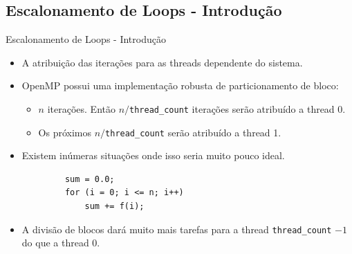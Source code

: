 	\subsection{Escalonamento de Loops - Introdução}
	\begin{frame}[fragile]{Escalonamento de Loops - Introdução}
		\begin{itemize}
			\item A atribuição das iterações para as threads dependente do sistema.
			\item OpenMP possui uma implementação robusta de particionamento de bloco:
			\begin{itemize}
				\item $n$ iterações. Então $n/${\tt thread\_count} iterações serão atribuído a thread 0.
				\item Os próximos $n/${\tt thread\_count} serão atribuído a thread 1.
			\end{itemize}
			\item Existem inúmeras situações onde isso seria muito pouco ideal.
		\end{itemize}
		\begin{verbatim}
			sum = 0.0;
			for (i = 0; i <= n; i++) 
				sum += f(i);
		\end{verbatim}
		\begin{itemize}
			\item A divisão de blocos dará muito mais tarefas para a thread {\tt thread\_count} $-1$ do que a thread 0.
		\end{itemize}
\end{frame}

